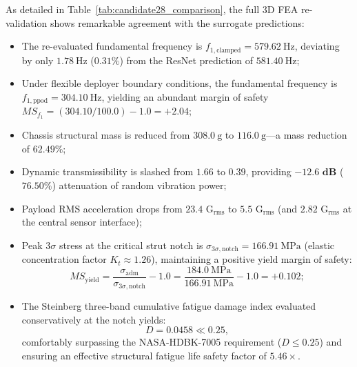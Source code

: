 As detailed in Table~\ref{tab:candidate28_comparison}, the full 3D FEA re-validation shows remarkable agreement with the surrogate predictions:
\begin{itemize}
\item The re-evaluated fundamental frequency is $f_{1,\text{clamped}} = \SI{579.62}{\hertz}$, deviating by only $\SI{1.78}{\hertz}$ ($0.31\%$) from the ResNet prediction of $\SI{581.40}{\hertz}$;
\item Under flexible deployer boundary conditions, the fundamental frequency is $f_{1,\text{ppod}} = \SI{304.10}{\hertz}$, yielding an abundant margin of safety $MS_{f_1} = (304.10 / 100.0) - 1.0 = +2.04$;
\item Chassis structural mass is reduced from $\SI{308.0}{\gram}$ to $\SI{116.0}{\gram}$—a mass reduction of $\mathbf{62.49\%}$;
\item Dynamic transmissibility is slashed from $1.66$ to $0.39$, providing $\mathbf{-12.6\text{ dB}}$ ($\mathbf{76.50\%}$) attenuation of random vibration power;
\item Payload RMS acceleration drops from $23.4\text{ G}_{\text{rms}}$ to $5.5\text{ G}_{\text{rms}}$ (and $2.82\text{ G}_{\text{rms}}$ at the central sensor interface);
\item Peak $3\sigma$ stress at the critical strut notch is $\sigma_{3\sigma,\text{notch}} = \SI{166.91}{\mega\pascal}$ (elastic concentration factor $K_t \approx 1.26$), maintaining a positive yield margin of safety:
\begin{equation}
MS_{\text{yield}} = \frac{\sigma_{\text{adm}}}{\sigma_{3\sigma,\text{notch}}} - 1.0 = \frac{\SI{184.0}{\mega\pascal}}{\SI{166.91}{\mega\pascal}} - 1.0 = \mathbf{+0.102};
\label{eq:ms_yield_check}
\end{equation}
\item The Steinberg three-band cumulative fatigue damage index evaluated conservatively at the notch yields:
\begin{equation}
D = 0.0458 \ll 0.25,
\label{eq:steinberg_check}
\end{equation}
comfortably surpassing the NASA-HDBK-7005 requirement ($D \le 0.25$) and ensuring an effective structural fatigue life safety factor of $5.46\times$.
\end{itemize}

